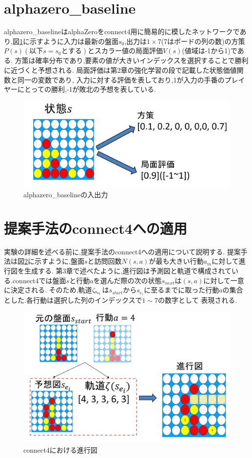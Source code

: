 \section{alphazero\_baseline}
alphazero\_baseline\cite{baseline}はalphaZeroをconnect4用に簡易的に模したネットワークであり,図\ref{fig:baseline}に示すように入力は最新の盤面$s_0$,出力は$1\times7$(7はボードの列の数)の方策$P(s)(以下s=s_0とする)$とスカラー値の局面評価$V(s)$(値域は-1から1)である.
方策は確率分布であり,要素の値が大きいインデックスを選択することで勝利に近づくと予想される.
局面評価は第2章の強化学習の段で記載した状態価値関数と同一の変数であり,
入力に対する評価を表しており,1が入力の手番のプレイヤーにとっての勝利,-1が敗北の予想を表している.

\begin{figure}[t]
    \centering
    \includegraphics[trim={0cm 0cm 0cm 0cm},clip]{./figure/baseline.png}

    \caption{alphazero\_baselineの入出力}
    \label{fig:baseline}
\end{figure}
\section{提案手法のconnect4への適用}
実験の詳細を述べる前に,提案手法のconnect4への適用について説明する.
提案手法は図\ref{fig:double}に示すように,盤面$s$と訪問回数$N(s, a)$が最も大きい行動$a_m$に対して進行図を生成する.
第3章で述べたように,進行図は予測図と軌道で構成されている.connect4では盤面$s$と行動$a$を選んだ際の次の状態$s_{next}$は$(s, a)$に対して一意に決定される.
そのため,軌道$\rm{{\zeta}_{s_{e_i}}}$は$s_{start}$から$s_{e_i}$に至るまでに取った行動$a$の集合とした.各行動は選択した列のインデックスで$1\sim7$の数字として
表現される.
\begin{figure}[t]
	\centering
	\includegraphics[width=\linewidth]{./figure/double.png}
	\caption{connect4における進行図}
	\label{fig:double}
\end{figure}


